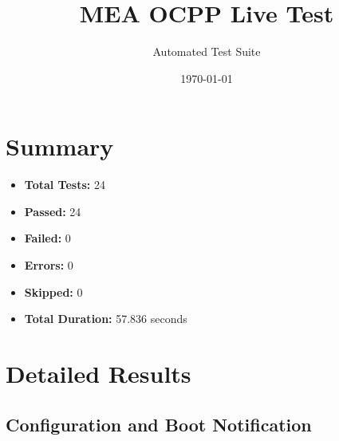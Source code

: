 \documentclass{article}
\title{MEA OCPP Live Test}
\author{Automated Test Suite}
\date{\today}
\begin{document}
\maketitle

\section{Summary}
\begin{itemize}
    \item \textbf{Total Tests:} 24
    \item \textbf{Passed:} 24
    \item \textbf{Failed:} 0
    \item \textbf{Errors:} 0
    \item \textbf{Skipped:} 0
    \item \textbf{Total Duration:} 57.836 seconds
\end{itemize}

\section{Detailed Results}
\subsection{Configuration and Boot Notification}
\end{document}
